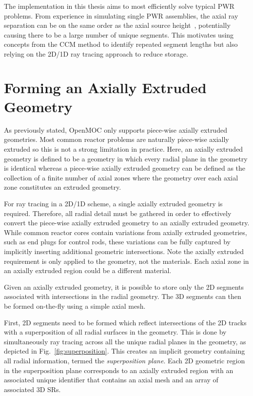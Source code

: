 The implementation in this thesis aims to most efficiently solve typical \ac{PWR} problems. From experience in simulating single \ac{PWR} assemblies, the axial ray separation can be on the same order as the axial source height~\cite{openmoc-beavrs}, potentially causing there to be a large number of unique segments. This motivates using concepts from the \ac{CCM} method to identify repeated segment lengths but also relying on the 2D/1D ray tracing approach to reduce storage.

\section{Forming an Axially Extruded Geometry}
\label{sec:ax-extruded}

As previously stated, OpenMOC only supports piece-wise axially extruded geometries. Most common reactor problems are naturally piece-wise axially extruded so this is not a strong limitation in practice. Here, an axially extruded geometry is defined to be a geometry in which every radial plane in the geometry is identical whereas a piece-wise axially extruded geometry can be defined as the collection of a finite number of axial zones where the geometry over each axial zone constitutes an extruded geometry. 

For ray tracing in a 2D/1D scheme, a single axially extruded geometry is required. Therefore, all radial detail must be gathered in order to effectively convert the piece-wise axially extruded geometry to an axially extruded geometry. While common reactor cores contain variations from axially extruded geometries, such as end plugs for control rods, these variations can be fully captured by implicitly inserting additional geometric intersections. Note the axially extruded requirement is only applied to the geometry, not the materials. Each axial zone in an axially extruded region could be a different material. 

Given an axially extruded geometry, it is possible to store only the 2D segments associated with intersections in the radial geometry. The 3D segments can then be formed on-the-fly using a simple axial mesh.

First, 2D segments need to be formed which reflect intersections of the 2D tracks with a superposition of all radial surfaces in the geometry. This is done by simultaneously ray tracing across all the unique radial planes in the geometry, as depicted in Fig.~\ref{fig:superposition}. This creates an implicit geometry containing all radial information, termed the \textit{superposition plane}. Each 2D geometric region in the superposition plane corresponds to an axially extruded region with an associated unique identifier that contains an axial mesh and an array of associated 3D \ac{SR}s. 

